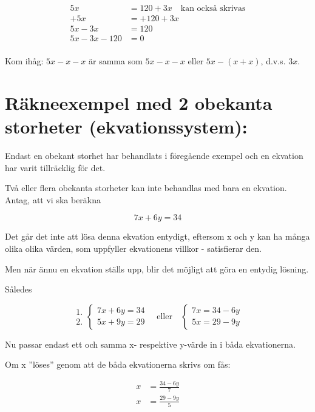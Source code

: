 \begin{align*}
  5x &= 120 + 3x \quad \text{kan också skrivas} \\
  +5x &= +120+ 3x \\
  5x-3x &= 120 \\
  5x- 3x-120 &= 0 \\
\end{align*}

Kom ihåg: \(5x-x-x\) är samma som \(5x-x-x\) eller \(5x-(x+x)\), d.v.s. \(3x\).

\section{Räkneexempel med 2 obekanta storheter (ekvationssystem):}

Endast en obekant storhet har behandlats i föregående exempel och en ekvation
har varit tillräcklig för det.

Två eller flera obekanta storheter kan inte behandlas med bara en ekvation.
Antag, att vi ska beräkna

\[7x+6y=34\]

Det går det inte att lösa denna ekvation entydigt, eftersom x och y kan ha många
olika olika värden, som uppfyller ekvationens villkor - satisfierar den.

Men när ännu en ekvation ställs upp, blir det möjligt att göra en entydig
lösning.

Således

\[
\begin{array}{c}
1.\\2.
\end{array}
\left\{
\begin{array}{l}
7x + 6y = 34\\
5x + 9y = 29
\end{array}
\right.
\quad \text{eller} \quad
\left\{
\begin{array}{l}
7x = 34 - 6y\\
5x = 29 - 9y 
\end{array}
\right. 
\]

Nu passar endast ett och samma x- respektive y-värde in i båda ekvationerna.

Om x ''löses'' genom att de båda ekvationerna skrivs om fås:

\begin{align}
  \label{eq:1}
  x &= \frac{34-6y}{7}\\
  \label{eq:2}
  x &= \frac{29-9y}{5}
\end{align}

